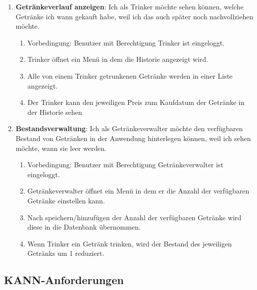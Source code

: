 \documentclass[conference,a4paper]{cs-techrep}
\begin{document}
\begin{enumerate}[{USS}1]

\item \textbf{Getränkeverlauf anzeigen}: Ich als Trinker möchte sehen können, welche Getränke ich wann gekauft habe, weil ich das auch später noch nachvollziehen möchte.
\begin{enumerate}
	\item Vorbedingung: Benutzer mit Berechtigung Trinker ist eingeloggt.
	\item Trinker öffnet ein Menü in dem die Historie angezeigt wird.
	\item Alle von einem Trinker getrunkenen Getränke werden in einer Liste angezeigt.
	\item Der Trinker kann den jeweiligen Preis zum Kaufdatum der Getränke in der Historie sehen
\end{enumerate}

\item \textbf{Bestandsverwaltung}: Ich als Getränkeverwalter möchte den verfügbaren Bestand von Getränken in der Anwendung hinterlegen können, weil ich sehen möchte, wann sie leer werden.
\begin{enumerate}
	\item Vorbedingung: Benutzer mit Berechtigung Getränkeverwalter ist eingeloggt.
	\item Getränkeverwalter öffnet ein Menü in dem er die Anzahl der verfügbaren Getränke einstellen kann.
	\item Nach speichern/hinzufügen der Anzahl der verfügbaren Getränke wird diese in die Datenbank übernommen.
	\item Wenn Trinker ein Getränk trinken, wird der Bestand des jeweiligen Getränks um 1 reduziert.
\end{enumerate}

\end{enumerate}

\subsection{KANN-Anforderungen}
\end{document}
